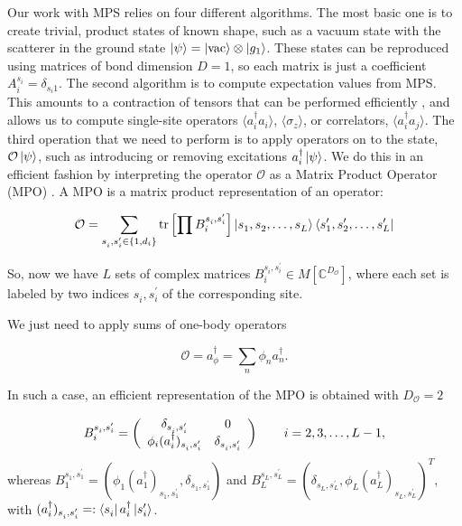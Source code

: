\documentclass[notitlepage, prx, preprint, amsmath,superscriptaddress,amssymb]{revtex4-1}
\begin{document}
Our work with MPS relies on four different algorithms. The most basic one is to create trivial, product states of known shape, such as a vacuum state with the scatterer in the ground state $\ket{\psi}=\ket{\text{vac}}\otimes \ket{g_1}$. These states can be reproduced using matrices of bond dimension $D=1$, so each matrix is just a coefficient $A_i^{s_i}=\delta_{s_i1}$. The second algorithm is to compute expectation values from MPS. This amounts to a contraction of tensors that can be performed efficiently \cite{Ripoll2006}, and allows us to compute single-site operators $\langle a^\dagger_i a_i\rangle$, $\langle \sigma_z\rangle$, or correlators, $\langle a_i^\dagger a_j\rangle$. The third operation that we need to perform is to apply operators on to the state, $\mathcal{O}\ket{\psi}$, such as introducing or removing excitations $a_i^\dagger\ket{\psi}$. We do this in an efficient fashion by interpreting the operator $\mathcal{O}$ as a Matrix Product Operator (MPO) \cite{Pirvu2010}. A MPO is a matrix product representation of an operator:

\begin{equation}
\mathcal{O} = \sum_{s_{i}^{},s_{i}^\prime \in \{1,d_i\}} \mathrm{tr}\left[\prod B_i^{s_i^{},s_i^\prime}\right]\ket{s_1^{},s_2^{},\ldots,s_L^{}}\bra{s_1^\prime,s_2^\prime,\ldots,s_L^\prime}
\end{equation}

So, now we have $L$ sets of complex matrices $B_i^{s_i^{},s_i^\prime} \in M[\mathbb{C}^{D_\mathcal{O}}]$, where each set is labeled by two indices $s_i^{},s_i^\prime$ of the corresponding site.

We just need to apply sums of one-body operators

\begin{equation}
\mathcal{O} = a_\phi^\dagger = \sum_n \phi_n a_n^\dagger.
\end{equation}

In such a case, an efficient representation of the MPO is obtained with $D_\mathcal{O}=2$

\begin{equation}
B_i^{s_i^{},s_i^\prime}=\left(\begin{array}{c c}
\delta_{s_i^{},s_i^\prime} & 0\\
\phi_i(a_i^\dagger)_{s_i^{},s_i^\prime} & \delta_{s_i^{},s_i^\prime}
\end{array}\right)\qquad i=2,3,\dots,L-1,
\end{equation}
whereas $B_1^{s_1^{},s_1^\prime}=(\phi_1(a_1^\dagger)_{s_1^{},s_1^\prime},\delta_{s_1^{},s_1^\prime})$ and $B_L^{s_L^{},s_L^\prime}=(\delta_{s_L^{},s_L^\prime},\phi_L(a_L^\dagger)_{s_L^{},s_L^\prime})^T$, with $(a_i^\dagger)_{s_i^{},s_i^\prime}=:\bra{s_i^{}}a_i^\dagger\ket{s_i^\prime}$.
\end{document}
